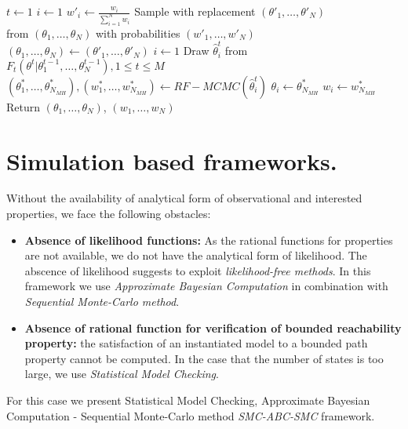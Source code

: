 \begin{algorithm}
      \begin{algorithmic}[H]
            \State $t \leftarrow 1$
            \State $i \leftarrow 1$ 
            \State $w'_i \leftarrow \frac{w_i}{\sum_{i=1}^N w_i} $
            \EndWhile
            \State Sample with replacement $(\theta'_1,\ldots,\theta'_N)$  \\\hspace{1.5cm} from $(\theta_1,\ldots,\theta_N)$ with probabilities $(w'_1,\ldots,w'_N)$
            \State $(\theta_1,\ldots,\theta_N) \leftarrow (\theta'_1,\ldots,\theta'_N)$
            \State $i \leftarrow 1$
             
            \State Draw $\hat{\theta}^t_i$ from $F_t(\theta^t | \theta^{t-1}_1,\ldots,\theta^{t-1}_N), 1\leq t \leq M$
            \State $(\theta^*_1,\ldots,\theta^*_{N_{MH}}), (w^*_1,\ldots,w^*_{N_{MH}}) \leftarrow RF-MCMC(\hat{\theta}^t_i)$
            \State $\theta_i \leftarrow \theta^*_{N_{MH}}$
            \State $w_i \leftarrow w^*_{N_{MH}}$
            \EndWhile
            \EndWhile
            \State Return $(\theta_1,\ldots,\theta_{N})$, $(w_1,\ldots,w_{N})$
            \EndProcedure
      \end{algorithmic}
\end{algorithm}

\section{Simulation based frameworks.}

Without the availability of analytical form of observational and interested properties, we face the
following obstacles:
\begin{itemize}
      \item \textbf{Absence of likelihood functions:} As the rational functions for properties are
            not available, we do not have the analytical form of likelihood. The abscence of
            likelihood suggests to exploit \textit{likelihood-free methods}. In this framework we
            use \textit{Approximate Bayesian Computation} in combination with \textit{Sequential
                  Monte-Carlo method}.
      \item \textbf{Absence of rational function for verification of bounded reachability property:}
            the satisfaction of an instantiated model to a bounded path property cannot be computed.
            In the case that the number of states is too large, we use \textit{Statistical Model
                  Checking}.
\end{itemize}
For this case we present Statistical Model Checking, Approximate Bayesian Computation - Sequential
Monte-Carlo method \textit{SMC-ABC-SMC} framework.

